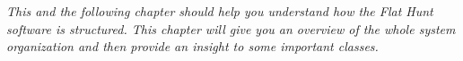 \emph{This and the following chapter should help you understand how the Flat Hunt software is structured. This chapter will give you an overview of the whole system organization and then provide an insight to some important classes.}

